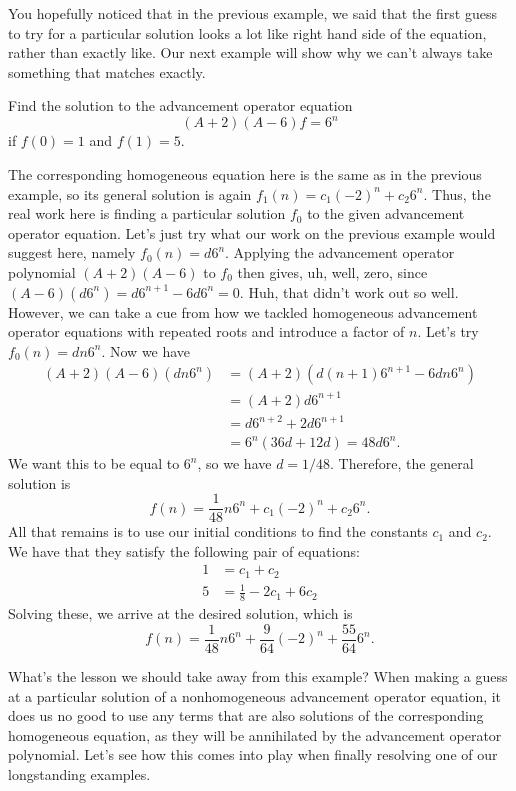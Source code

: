 
You hopefully noticed that in the previous example, we said that the
first guess to try for a particular solution looks a lot like right
hand side of the equation, rather than exactly like. Our next example
will show why we can't always take something that matches exactly.

\begin{example}
  Find the solution to the advancement operator equation
  \[(A+2)(A-6)f=6^n\]
  if $f(0) = 1$ and $f(1) = 5$.

  The corresponding homogeneous equation here is the same as in the
  previous example, so its general solution is again $f_1(n) =
  c_1(-2)^n + c_2 6^n$. Thus, the real work here is finding a
  particular solution $f_0$ to the given advancement operator
  equation. Let's just try what our work on the previous example would
  suggest here, namely $f_0(n) = d6^n$. Applying the advancement
  operator polynomial $(A+2)(A-6)$ to $f_0$ then gives, uh, well,
  zero, since $(A-6)(d6^n) = d6^{n+1}-6d6^n =0$. Huh, that didn't work
  out so well. However, we can take a cue from how we tackled
  homogeneous advancement operator equations with repeated roots and
  introduce a factor of $n$. Let's try $f_0(n) = dn6^n$. Now we have
  \begin{align*}
    (A+2)(A-6)(dn6^n) &= (A+2)(d(n+1)6^{n+1}-6dn6^n)\\
    &= (A+2)d6^{n+1}\\
    &= d6^{n+2} + 2d 6^{n+1}\\
    &= 6^n(36d+12d) = 48d6^n.
  \end{align*}
  We want this to be equal to $6^n$, so we have $d = 1/48$. Therefore,
  the general solution is
  \[f(n) = \frac{1}{48}n6^n + c_1 (-2)^n + c_2 6^n.\]
  All that remains is to use our initial conditions to find the
  constants $c_1$ and $c_2$. We have that they satisfy the following
  pair of equations:
  \begin{align*}
    1 & = c_1 + c_2\\
    5 & = \frac{1}{8} -2c_1+6c_2
  \end{align*}
  Solving these, we arrive at the desired solution, which is
  \[f(n) = \frac{1}{48}n6^n + \frac{9}{64} (-2)^n + \frac{55}{64} 6^n.\]
\end{example}

What's the lesson we should take away from this example? When making a
guess at a particular solution of a nonhomogeneous advancement
operator equation, it does us no good to use any terms that are also
solutions of the corresponding homogeneous equation, as they will be
annihilated by the advancement operator polynomial. Let's see how this
comes into play when finally resolving one of our longstanding examples.


